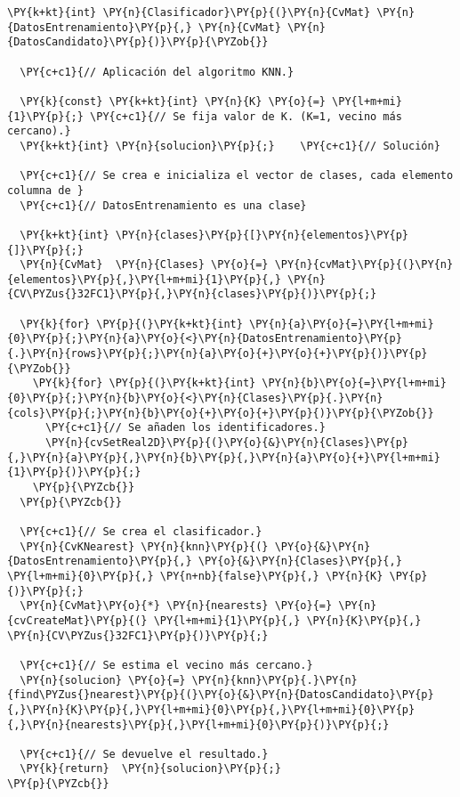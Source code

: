 \begin{Verbatim}[commandchars=\\\{\}]
\PY{k+kt}{int} \PY{n}{Clasificador}\PY{p}{(}\PY{n}{CvMat} \PY{n}{DatosEntrenamiento}\PY{p}{,} \PY{n}{CvMat} \PY{n}{DatosCandidato}\PY{p}{)}\PY{p}{\PYZob{}}

  \PY{c+c1}{// Aplicación del algoritmo KNN.}
  
  \PY{k}{const} \PY{k+kt}{int} \PY{n}{K} \PY{o}{=} \PY{l+m+mi}{1}\PY{p}{;} \PY{c+c1}{// Se fija valor de K. (K=1, vecino más cercano).}
  \PY{k+kt}{int} \PY{n}{solucion}\PY{p}{;}    \PY{c+c1}{// Solución}
  
  \PY{c+c1}{// Se crea e inicializa el vector de clases, cada elemento columna de }
  \PY{c+c1}{// DatosEntrenamiento es una clase}
  
  \PY{k+kt}{int} \PY{n}{clases}\PY{p}{[}\PY{n}{elementos}\PY{p}{]}\PY{p}{;}	
  \PY{n}{CvMat}  \PY{n}{Clases} \PY{o}{=} \PY{n}{cvMat}\PY{p}{(}\PY{n}{elementos}\PY{p}{,}\PY{l+m+mi}{1}\PY{p}{,} \PY{n}{CV\PYZus{}32FC1}\PY{p}{,}\PY{n}{clases}\PY{p}{)}\PY{p}{;}
  
  \PY{k}{for} \PY{p}{(}\PY{k+kt}{int} \PY{n}{a}\PY{o}{=}\PY{l+m+mi}{0}\PY{p}{;}\PY{n}{a}\PY{o}{<}\PY{n}{DatosEntrenamiento}\PY{p}{.}\PY{n}{rows}\PY{p}{;}\PY{n}{a}\PY{o}{+}\PY{o}{+}\PY{p}{)}\PY{p}{\PYZob{}}
    \PY{k}{for} \PY{p}{(}\PY{k+kt}{int} \PY{n}{b}\PY{o}{=}\PY{l+m+mi}{0}\PY{p}{;}\PY{n}{b}\PY{o}{<}\PY{n}{Clases}\PY{p}{.}\PY{n}{cols}\PY{p}{;}\PY{n}{b}\PY{o}{+}\PY{o}{+}\PY{p}{)}\PY{p}{\PYZob{}}
      \PY{c+c1}{// Se añaden los identificadores.}
      \PY{n}{cvSetReal2D}\PY{p}{(}\PY{o}{&}\PY{n}{Clases}\PY{p}{,}\PY{n}{a}\PY{p}{,}\PY{n}{b}\PY{p}{,}\PY{n}{a}\PY{o}{+}\PY{l+m+mi}{1}\PY{p}{)}\PY{p}{;}
    \PY{p}{\PYZcb{}}
  \PY{p}{\PYZcb{}}
  
  \PY{c+c1}{// Se crea el clasificador.}
  \PY{n}{CvKNearest} \PY{n}{knn}\PY{p}{(} \PY{o}{&}\PY{n}{DatosEntrenamiento}\PY{p}{,} \PY{o}{&}\PY{n}{Clases}\PY{p}{,} \PY{l+m+mi}{0}\PY{p}{,} \PY{n+nb}{false}\PY{p}{,} \PY{n}{K} \PY{p}{)}\PY{p}{;}
  \PY{n}{CvMat}\PY{o}{*} \PY{n}{nearests} \PY{o}{=} \PY{n}{cvCreateMat}\PY{p}{(} \PY{l+m+mi}{1}\PY{p}{,} \PY{n}{K}\PY{p}{,} \PY{n}{CV\PYZus{}32FC1}\PY{p}{)}\PY{p}{;}
  
  \PY{c+c1}{// Se estima el vecino más cercano.}
  \PY{n}{solucion} \PY{o}{=} \PY{n}{knn}\PY{p}{.}\PY{n}{find\PYZus{}nearest}\PY{p}{(}\PY{o}{&}\PY{n}{DatosCandidato}\PY{p}{,}\PY{n}{K}\PY{p}{,}\PY{l+m+mi}{0}\PY{p}{,}\PY{l+m+mi}{0}\PY{p}{,}\PY{n}{nearests}\PY{p}{,}\PY{l+m+mi}{0}\PY{p}{)}\PY{p}{;}
   
  \PY{c+c1}{// Se devuelve el resultado.}
  \PY{k}{return}  \PY{n}{solucion}\PY{p}{;}
\PY{p}{\PYZcb{}}
\end{Verbatim}

